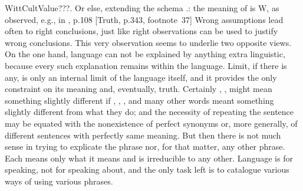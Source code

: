 \citet{The limit of language is shown by its being impossible to describe the
  fact which corresponds to (is the translation of) a sentence, without simply
  repeating the sentence.}{WittCultValue}{???. Or else, extending the schema
  .: the meaning of  is W, as
  observed, e.g., in 
  \citeauthor*{DummettM}, p.108 [Truth, p.343, footnote~37] } Wrong assumptions lead
often to right conclusions, just like right observations can be used to justify
wrong conclusions.  This very observation seems to underlie two opposite views.
On the one hand, language can not be explained by anything extra linguistic,
because every such explanation remains within the language. Limit, if there is
any, is only an internal limit of the language itself, and it provides the only
constraint on its meaning and, eventually, truth.  Certainly ,
, might mean something slightly different if
, , ,  and many other words meant
something slightly different from what they do; and the necessity of repeating
the sentence may be equated with the nonexistence of perfect synonyms or, more
generally, of different sentences with perfectly same meaning.  But then there is not much sense in trying to
explicate the phrase  nor, for that matter, any other phrase. Each means only what it means
and is irreducible to any other.
Language is for speaking, not for
speaking about, and the only task left is to catalogue various ways of
using various phrases. 

